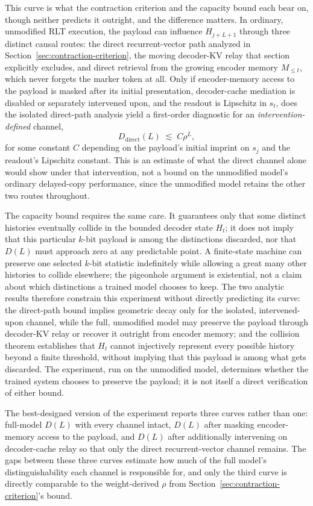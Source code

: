 \documentclass[11pt]{article}
\begin{document}
This curve is what the contraction criterion and the capacity bound each bear on, though neither predicts it outright, and the difference matters. In ordinary, unmodified RLT execution, the payload can influence $H_{j+L+1}$ through three distinct causal routes: the direct recurrent-vector path analyzed in Section~\ref{sec:contraction-criterion}, the moving decoder-KV relay that section explicitly excludes, and direct retrieval from the growing encoder memory $M_{\le t}$, which never forgets the marker token at all. Only if encoder-memory access to the payload is masked after its initial presentation, decoder-cache mediation is disabled or separately intervened upon, and the readout is Lipschitz in $s_t$, does the isolated direct-path analysis yield a first-order diagnostic for an \emph{intervention-defined} channel,
\[
D_{\mathrm{direct}}(L) \;\lesssim\; C \rho^{L},
\]
for some constant $C$ depending on the payload's initial imprint on $s_j$ and the readout's Lipschitz constant. This is an estimate of what the direct channel alone would show under that intervention, not a bound on the unmodified model's ordinary delayed-copy performance, since the unmodified model retains the other two routes throughout.

The capacity bound requires the same care. It guarantees only that some distinct histories eventually collide in the bounded decoder state $H_t$; it does not imply that this particular $k$-bit payload is among the distinctions discarded, nor that $D(L)$ must approach zero at any predictable point. A finite-state machine can preserve one selected $k$-bit statistic indefinitely while allowing a great many other histories to collide elsewhere; the pigeonhole argument is existential, not a claim about which distinctions a trained model chooses to keep. The two analytic results therefore constrain this experiment without directly predicting its curve: the direct-path bound implies geometric decay only for the isolated, intervened-upon channel, while the full, unmodified model may preserve the payload through decoder-KV relay or recover it outright from encoder memory; and the collision theorem establishes that $H_t$ cannot injectively represent every possible history beyond a finite threshold, without implying that this payload is among what gets discarded. The experiment, run on the unmodified model, determines whether the trained system chooses to preserve the payload; it is not itself a direct verification of either bound.

The best-designed version of the experiment reports three curves rather than one: full-model $D(L)$ with every channel intact, $D(L)$ after masking encoder-memory access to the payload, and $D(L)$ after additionally intervening on decoder-cache relay so that only the direct recurrent-vector channel remains. The gaps between these three curves estimate how much of the full model's distinguishability each channel is responsible for, and only the third curve is directly comparable to the weight-derived $\rho$ from Section~\ref{sec:contraction-criterion}'s bound.
\end{document}
